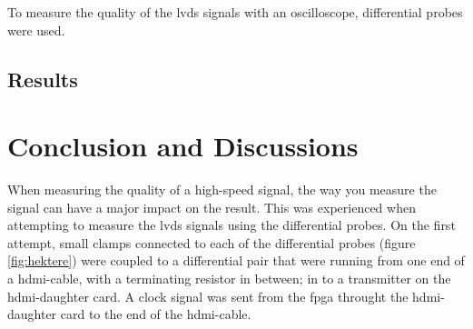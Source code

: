 \documentclass[main.tex]{subfiles}
\begin{document}
To measure the quality of the \gls{lvds} signals with an oscilloscope, differential probes were used.  


\subsection{Results}


\section{Conclusion and Discussions}


When measuring the quality of a high-speed signal, the way you measure the signal can have a major impact on the result. This was experienced when attempting to measure the \gls{lvds} signals using the differential probes. On the first attempt, small clamps connected to each of the differential probes (figure \ref{fig:hektere}) were coupled to a differential pair that were running from one end of a hdmi-cable, with a terminating resistor in between; in to a transmitter on the \gls{hdmi}-daughter card. A clock signal was sent from the \gls{fpga} throught the \gls{hdmi}-daughter card to the end of the hdmi-cable. 

\begin{figure}[H] 
   \begin{center}
   \end{center}
\end{figure}
\end{document}
